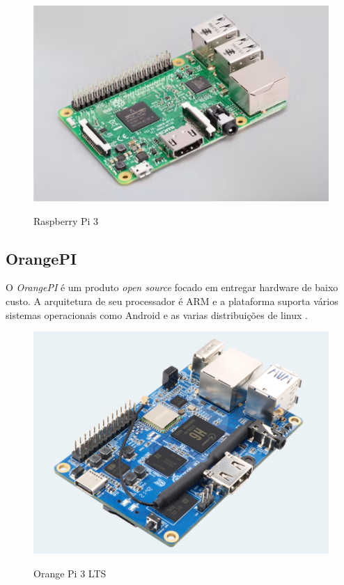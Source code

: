 \begin{figure}[!htbp]
  \caption{Raspberry Pi 3}
  \includegraphics[scale=0.4]{images/rasp.png}
  \label{figura:rasp}
\end{figure}

\subsection{OrangePI}

O \textit{OrangePI} é um produto \textit{open source} focado em entregar hardware de baixo custo. A arquitetura de seu processador é ARM e a plataforma suporta vários sistemas operacionais como Android e as varias distribuições de linux \cite{orangepi}.

\begin{figure}[!htbp]
  \caption{Orange Pi 3 LTS}
  \includegraphics[scale=0.4]{images/orange.png}
  \label{figura:orange}
\end{figure}

